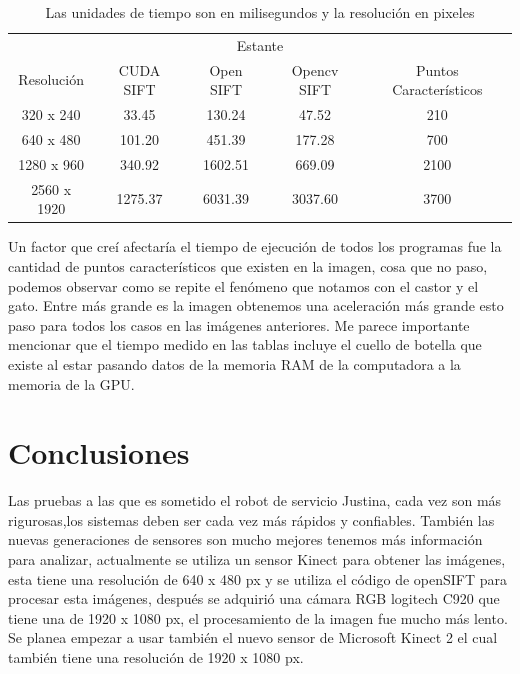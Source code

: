 \begin{table}[phtb]
\centering
\begin{tabular}{|c|c|c|c|c|}
\hline

\multicolumn{5}{|c|}{Estante} \\
\cline{1-5}
Resolución & CUDA SIFT & Open SIFT & Opencv SIFT & Puntos Característicos\\
\hline \hline
 320 x 240  & 33.45   & 130.24   & 47.52   & 210\\ \cline{1-5}
 640 x 480  & 101.20  &  451.39  & 177.28  & 700\\ \cline{1-5}
1280 x 960  & 340.92  &  1602.51 & 669.09  & 2100\\ \cline{1-5}
2560 x 1920 & 1275.37 &  6031.39 & 3037.60 & 3700\\ \cline{1-5}

\end{tabular}
\caption{Las unidades de tiempo son en milisegundos y la resolución en pixeles}
\label{tabla:final}
\end{table}

Un factor que creí afectaría el tiempo de ejecución de todos los programas fue la cantidad de puntos característicos que existen en la imagen, cosa que no paso, podemos observar como se repite el fenómeno que notamos con el castor y el gato. Entre más grande es la imagen obtenemos una aceleración más grande esto paso para todos los casos en las imágenes anteriores. Me parece importante mencionar que el tiempo medido en las tablas incluye el cuello de botella que existe al estar pasando datos de la memoria RAM de la computadora a la memoria de la GPU.     

\pagebreak
\section{Conclusiones}

 Las pruebas a las que es sometido el robot de servicio Justina, cada vez son más rigurosas,los sistemas deben ser cada vez más rápidos y confiables. También las nuevas generaciones de sensores son mucho mejores tenemos más información para analizar, actualmente se utiliza un sensor Kinect para obtener las imágenes, esta tiene una resolución de  640 x 480 px y se utiliza el código de openSIFT para procesar esta imágenes, después     se adquirió una cámara RGB logitech C920 que tiene una  de 1920 x 1080 px, el procesamiento de la imagen fue mucho más lento. Se planea empezar a usar también el nuevo sensor de Microsoft Kinect 2 el cual también tiene una resolución de 1920 x 1080 px. 
 

